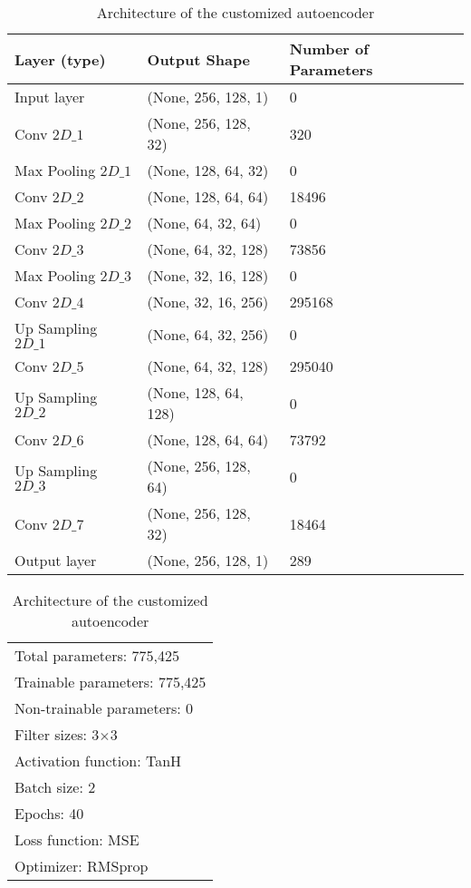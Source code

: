 \documentclass[a4paper]{article}
\begin{document}
\begin{table} [H]
    \caption{Architecture of the customized autoencoder}

    \centering
    \begin{tabular}{p{4cm}p{4.5cm}p{1.8cm}}
        \hline
        Layer (type)       & Output Shape         & Number of Parameters \\
        \hline
        Input layer        & (None, 256, 128,   1)  & 0   \\   
        Conv $2D\_1$        & (None, 256, 128,  32) & 320 \\    
        Max Pooling $2D\_1$ & (None, 128,  64,  32)  & 0   \\ 
        Conv $2D\_2$        & (None, 128,  64,  64)  & 18496 \\   
        Max Pooling $2D\_2$ & (None,  64,  32,  64)   & 0   \\
        Conv $2D\_3$        & (None,  64,  32, 128)  & 73856\\
        Max Pooling $2D\_3$ & (None,  32,  16, 128)  & 0   \\
        Conv $2D\_4$        & (None,  32,  16, 256)  & 295168 \\  
        Up Sampling $2D\_1$ & (None,  64,  32, 256)  & 0   \\
        Conv $2D\_5$       & (None,  64,  32, 128)  & 295040\\  
        Up Sampling $2D\_2$ & (None, 128,  64, 128) & 0   \\
        Conv $2D\_6$        & (None, 128,  64,  64)  & 73792 \\ 
        Up Sampling $2D\_3$ & (None, 256, 128,  64) & 0   \\
        Conv $2D\_7$        & (None, 256, 128,  32) & 18464\\
        Output layer       & (None, 256, 128,   1)  & 289 \\
        \hline       
    \end{tabular}
    
    \centering
    \begin{tabular}{p{11.1cm}}
        \hline
        Total parameters: 775,425\\
        Trainable parameters: 775,425\\
        Non-trainable parameters: 0\\
        Filter sizes: 3$\times$3\\
        Activation function: TanH\\
        Batch size: 2\\
        Epochs: 40\\
        Loss function: MSE\\
        Optimizer: RMSprop\\
        \hline       
    \end{tabular}
    \label{AE}
\end{table} 
\end{document}
